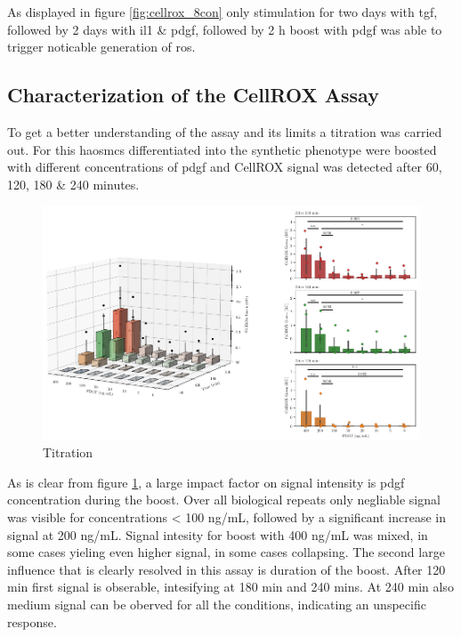     As displayed in figure \ref{fig:cellrox_8con} only stimulation for two days with \ac{tgf}, followed by 2 days with \ac{il1} \& \ac{pdgf}, followed by 2 h boost with \ac{pdgf} was able to trigger noticable generation of \ac{ros}.

    \subsection{Characterization of the CellROX Assay}
    To get a better understanding of the assay and its limits a titration was carried out. For this \acp{haosmc} differentiated into the synthetic phenotype were boosted with different concentrations of \ac{pdgf} and CellROX signal was detected after 60, 120, 180 \& 240 minutes.

    \begin{figure}[h]
    \capstart
        \centering
    	\includegraphics{Abbildung/CellROX_titration_no_norm.pdf}

    	\begin{minipage}{\captionwidth}
    		\caption[cellROX_titration]{ \newline Titration}
    		\label{fig:cellROX_titration}
    	\end{minipage}
    \end{figure}

    As is clear from figure \ref{fig:cellROX_titration}, a large impact factor on signal intensity is \ac{pdgf} concentration during the boost. Over all biological repeats only negliable signal was visible for concentrations < 100 ng/mL, followed by a significant increase in signal at 200 ng/mL. Signal intesity for boost with 400 ng/mL was mixed, in some cases yieling even higher signal, in some cases collapsing. The second large influence that is clearly resolved in this assay is duration of the boost. After 120 min first signal is obserable, intesifying at 180 min and 240 mins. At 240 min also medium signal can be oberved for all the conditions, indicating an unspecific response.

